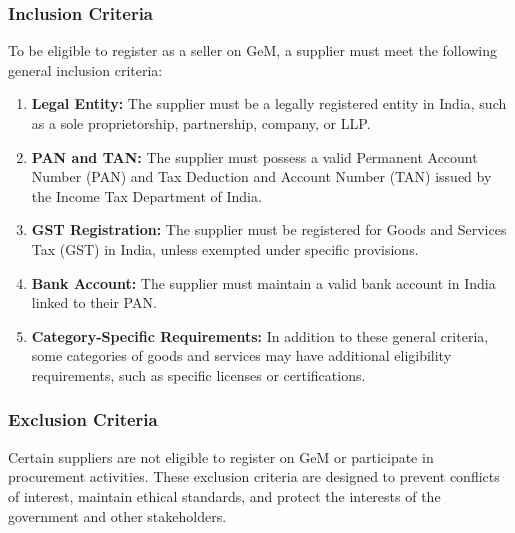 \subsubsection{Inclusion Criteria}

To be eligible to register as a seller on GeM, a supplier must meet the following general inclusion criteria:

\begin{enumerate}
    \item \textbf{Legal Entity:} The supplier must be a legally registered entity in India, such as a sole proprietorship, partnership, company, or LLP.
    
    \item \textbf{PAN and TAN:} The supplier must possess a valid Permanent Account Number (PAN) and Tax Deduction and Account Number (TAN) issued by the Income Tax Department of India.
    
    \item \textbf{GST Registration:} The supplier must be registered for Goods and Services Tax (GST) in India, unless exempted under specific provisions.
    
    \item \textbf{Bank Account:} The supplier must maintain a valid bank account in India linked to their PAN.
    
    \item \textbf{Category-Specific Requirements:} In addition to these general criteria, some categories of goods and services may have additional eligibility requirements, such as specific licenses or certifications.
\end{enumerate}

\subsubsection{Exclusion Criteria}

Certain suppliers are not eligible to register on GeM or participate in procurement activities. These exclusion criteria are designed to prevent conflicts of interest, maintain ethical standards, and protect the interests of the government and other stakeholders.

